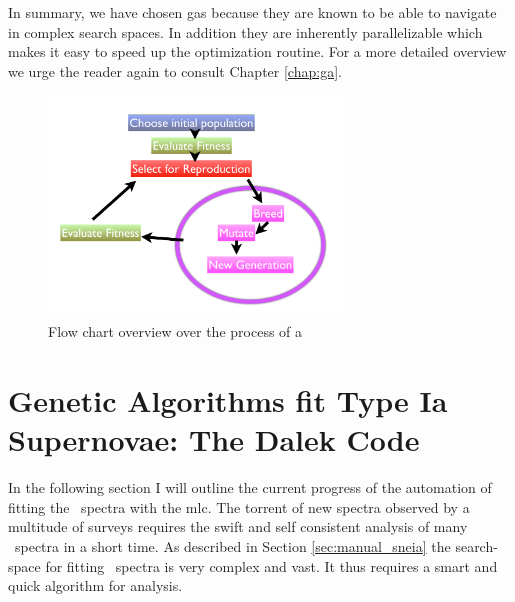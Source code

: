 In summary, we have chosen \glspl{ga} because they are known to be able to navigate in complex search spaces. In addition they are inherently parallelizable which makes it easy to speed up the optimization routine. For a more detailed overview we urge the reader again to consult Chapter \ref{chap:ga}.

\begin{figure}[htbp] %
   \centering
   \includegraphics[width=0.7\textwidth]{chapter_dalek/plots/ga_overview.pdf} 
   \caption{Flow chart overview over the process of a }
   \label{fig:ga_overview}
\end{figure}



\section{Genetic Algorithms fit Type Ia Supernovae: The Dalek Code}
\label{sec:dalek}

In the following section I will outline the current progress of the automation of fitting the \sneia\ spectra with the \gls{mlc}. The torrent of new spectra observed by a multitude of surveys requires the swift and self consistent analysis of many \sneia\ spectra in a short time. As described in Section \ref{sec:manual_sneia} the search-space for fitting \sneia\ spectra is very complex and vast. It thus requires a smart and quick algorithm for analysis.

